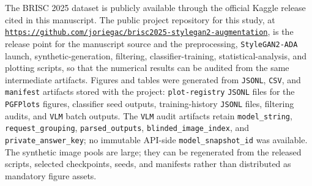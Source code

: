 \documentclass[conference,twoside]{IEEEtran}
\DeclareRobustCommand{\monourl}[1]{{\ttfamily\href{#1}{\nolinkurl{#1}}}}
\begin{document}
The BRISC 2025 dataset is publicly available through the official Kaggle release cited in this manuscript. The public project repository for this study, at \monourl{https://github.com/joriegac/brisc2025-stylegan2-augmentation}, is the release point for the manuscript source and the preprocessing, \texttt{StyleGAN2-ADA} launch, synthetic-generation, filtering, classifier-training, statistical-analysis, and plotting scripts, so that the numerical results can be audited from the same intermediate artifacts. Figures and tables were generated from \texttt{JSONL}, \texttt{CSV}, and \texttt{manifest} artifacts stored with the project: \texttt{plot-registry} \texttt{JSONL} files for the \texttt{PGFPlots} figures, classifier seed outputs, training-history \texttt{JSONL} files, filtering audits, and \texttt{VLM} batch outputs. The \texttt{VLM} audit artifacts retain \texttt{model\_string}, \texttt{request\_grouping}, \texttt{parsed\_outputs}, \texttt{blinded\_image\_index}, and \texttt{private\_answer\_key}; no immutable API-side \texttt{model\_snapshot\_id} was available. The synthetic image pools are large; they can be regenerated from the released scripts, selected checkpoints, seeds, and manifests rather than distributed as mandatory figure assets.
\end{document}
